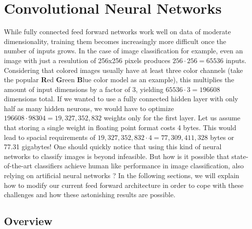 \chapter{Convolutional Neural Networks}

While fully connected feed forward networks work well on data of
moderate dimensionality, training them becomes increasingly more
difficult once the number of inputs grows. In the case of image
classification for example, even an image with just a resulution of
256x256 pixels produces \(256 \cdot 256 = 65536\) inputs. Considering
that colored images usually have at least three color channels (take
the popular \textbf{R}ed \textbf{G}reen \textbf{B}lue color model as
an example), this multiplies the amount of input dimensions by a
factor of 3, yielding \(65536 \cdot 3 = 196608\) dimensions total. If
we wanted to use a fully connected hidden layer with only half as many
hidden neurons, we would have to optimize \(196608 \cdot 98304 =
19,327,352,832\) weights only for the first layer. Let us assume that
storing a single weight in floating point format costs 4 bytes. This
would lead to spacial requirements of \(19,327,352,832 \cdot 4 =
77,309,411,328\) bytes or 77.31 gigabytes! One should quickly notice
that using this kind of neural networks to classify images is beyond
infeasible. But how is it possible that state-of-the-art classifiers
achieve human like performance in image classification, also
relying on artificial neural networks \cite{Russakovsky}? In the
following sections, we will explain how to modify our current feed
forward architecture in order to cope with these challenges and how
these astonishing results are possible.

\section{Overview}

